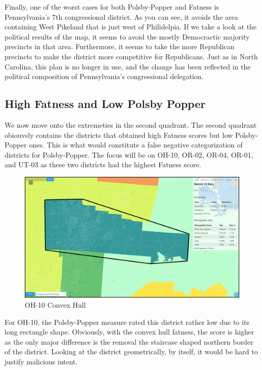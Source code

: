 \documentclass[letterpaper]{article}
\begin{document}
Finally, one of the worst cases for both Polsby-Popper and Fatness is Pennsylvania's 7th congressional district. As you can see, it avoids the area containing West Pikeland that is just west of Philidelpia. If we take a look at the political results of the map, it seems to avoid the mostly Democractic majority precincts in that area. Furthermore, it seems to take the more Republican precincts to make the district more competitive for Republicans. Just as in North Carolina, this plan is no longer in use, and the change has been reflected in the political composition of Pennsylvania's congressional delegation.

\subsection{High Fatness and Low Polsby Popper}
We now move onto the extremeties in the second quadrant. The second quadrant obiouvsly contains the districts that obtained high Fatness scores but low Polsby-Popper ones. This is what would constitute a false negative categorization of districts for Polsby-Popper. The focus will be on OH-10, OR-02, OR-04, OR-01, and UT-03 as these two districts had the highest Fatness score.

\begin{figure}[H]
	\includegraphics[width=\linewidth]{./figures/OH-10-ConvexHull.png}
	\caption{OH-10 Convex Hull}
	\label{fig:oh10convexHull}
\end{figure}

For OH-10, the Polsby-Popper measure rated this district rather low due to its long rectangle shape. Obviously, with the convex hull fatness, the score is higher as the only major difference is the removal the staircase shaped northern border of the district. Looking at the district geometrically, by itself, it would be hard to justify malicious intent.
\end{document}

